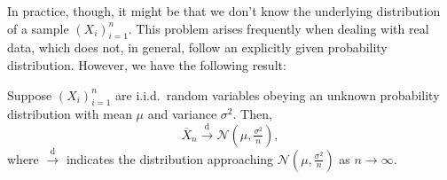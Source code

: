 In practice, though, it might be that we don't know the underlying distribution of a sample \({(X_i)}_{i=1}^n\). 
This problem arises frequently when dealing with real data, which does not, in general, follow an explicitly given probability distribution. 
However, we have the following result: 

\begin{theorem}
    Suppose \({(X_i)}_{i=1}^n\) are i.i.d.\ random variables obeying an unknown probability distribution with mean \(\mu\) and variance \(\sigma^2\). 
    Then, \[\overline{X}_n \overset{\mathrm{d}}{\longrightarrow} \mathscr{N}(\mu, \tfrac{\sigma^2}{n}),\]
    where \(\overset{\mathrm{d}}{\longrightarrow}\) indicates the distribution approaching \(\mathscr{N}(\mu, \frac{\sigma^2}{n})\) as \(n\to\infty\).
\end{theorem}

